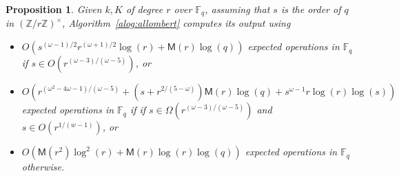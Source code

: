 \documentclass[12pt]{article}
\theoremstyle{plain}
\newtheorem{proposition}[theorem]{Proposition}
\theoremstyle{definition}
\def\Z{\ensuremath{\mathbb{Z}}}
\def\F{\ensuremath{\mathbb{F}}}
\def\MM{\ensuremath{\mathsf{M}}}
\begin{document}
\begin{proposition}
  \label{proposition:XiDelta-updated}
  Given $k,K$ of degree $r$ over $\F_q$, assuming that $s$ is the
  order of $q$ in $(\Z/r\Z)^\times$,   Algorithm~\ref{alog:allombert} 
 computes its output using 
  \begin{itemize}
  \item $O(s^{(\omega-1)/2}r^{(\omega+1)/2}\log(r)+\MM(r)\log(q))$
    expected operations in $\F_q$ if $s \in O(r^{(\omega-3)/(\omega-5)})$, or
  \item
    $O(
 r^{(\omega^2-4\omega-1)/(\omega-5)}+(s+r^{2/(5-\omega)})\MM(r)\log(q)
+s^{\omega-1}r\log(r)\log(s))$
    expected operations in $\F_q$ if if $s \in \Omega(r^{(\omega-3)/(\omega-5)})$
    and $s \in O(r^{1/(w-1)})$, or
  \item $O(\MM(r^2)\log^2(r) + \MM(r)\log(r)\log(q))$ expected operations in
    $\F_q$ otherwise.
  \end{itemize}
\end{proposition}
\end{document}
